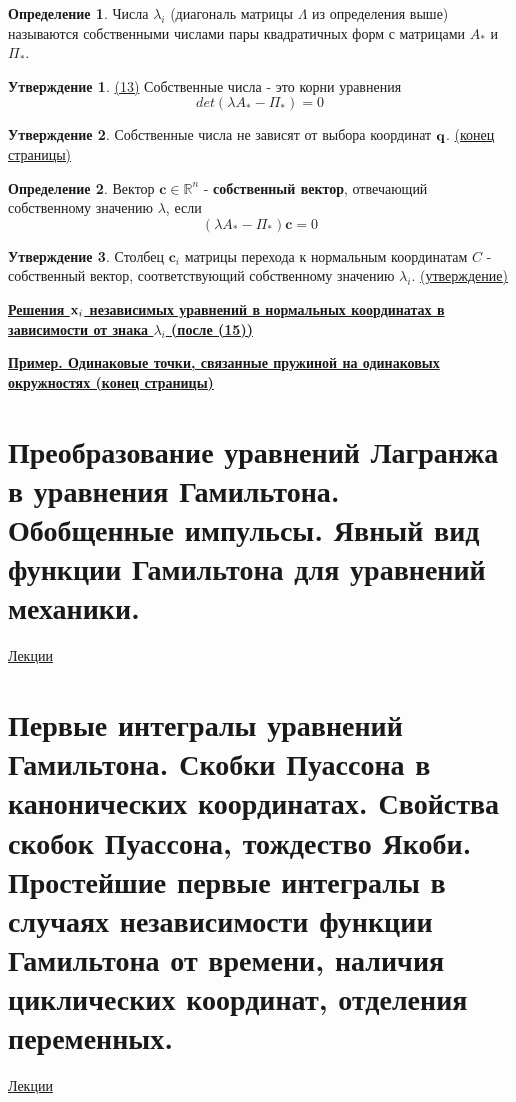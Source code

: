 \documentclass[specialist, subf, href, colorlinks=true, 12pt, times, mtpro, final]{disser}
\theoremstyle{definition}
\newtheorem{defn}{Определение}[section]
\newtheorem{state}{Утверждение}[section]
\begin{document}
	\begin{defn}
		Числа $\lambda_i$ (диагональ матрицы $\Lambda$ из определения выше) называются собственными числами пары квадратичных форм с матрицами $A_*$ и $\Pi_*$.
	\end{defn}  

	\begin{state}
		 \hyperlink {lects.12}{(13)} Собственные числа - это корни уравнения $$det (\lambda A_* - \Pi_*) = 0$$
	\end{state}

	\begin{state}
		Собственные числа не зависят от выбора координат $\mathbf{q}$. \hyperlink {lects.12}{(конец страницы)}
	\end{state} 

	\begin{defn}
		Вектор $\textbf{c} \in \mathbb{R}^n$ - \textbf{собственный вектор}, отвечающий собственному значению $\lambda$, если $$(\lambda A_* - \Pi_*)\textbf{c} = 0$$
	\end{defn} 

	\begin{state}
		Столбец $\textbf{c}_i$ матрицы  перехода к нормальным координатам $C$ - собственный вектор, соответствующий собственному значению $\lambda_i$. \hyperlink {lects.13}{(утверждение)}
	\end{state}  

	\bigskip
	\textbf{\hyperlink {lects.13}{Решения $\mathbf{x}_i$ независимых уравнений в нормальных координатах в зависимости от знака $\lambda_i$ (после (15))}}
	
	\bigskip
	\textbf{\hyperlink {lects.13}{Пример. Одинаковые точки, связанные пружиной на одинаковых окружностях (конец страницы)}}

	
    
    \section{Преобразование уравнений Лагранжа в уравнения Гамильтона. Обобщенные импульсы. Явный вид функции Гамильтона для уравнений механики.}
     \label{13}
     \hyperlink {lects.16}{Лекции} \\
    
        
    \section{Первые интегралы уравнений Гамильтона. Скобки Пуассона в канонических координатах. Свойства скобок Пуассона, тождество Якоби. Простейшие первые интегралы в случаях независимости функции Гамильтона от времени, наличия циклических координат, отделения переменных.}
     \label{14}
    \hyperlink {lects.18}{Лекции} \\
    
\end{document}
